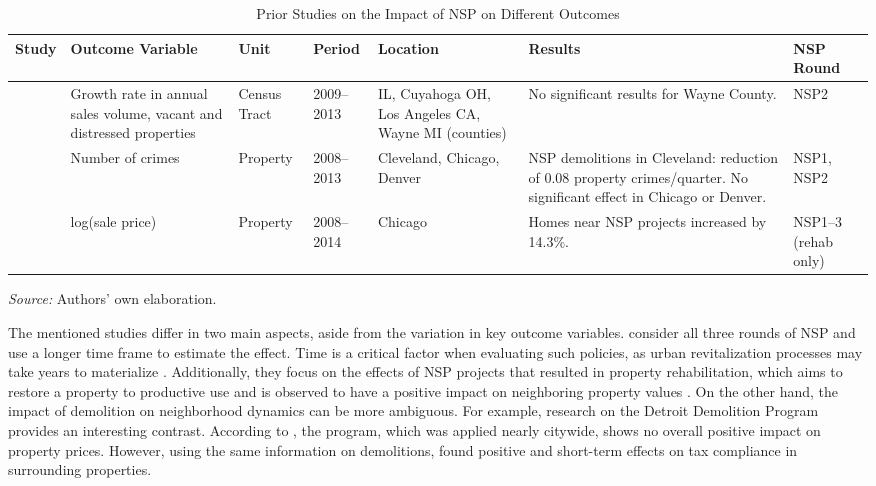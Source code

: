 \documentclass[12pt,authoryear]{elsarticle}
\begin{document}
\begin{table}[htbp]
\centering
\caption{Prior Studies on the Impact of NSP on Different Outcomes}
\label{tab:prior_studies}
\begin{threeparttable}
\small
\begin{tabularx}{\textwidth}{p{2.2cm}p{2.5cm}p{1.2cm}p{1.3cm}p{2.5cm}p{3cm}p{1cm}}
\toprule
Study & Outcome Variable & Unit & Period & Location & Results & NSP Round \\
\midrule
\citet{schuetz2016} & Growth rate in annual sales volume, vacant and distressed properties & Census Tract & 2009--2013 & IL, Cuyahoga OH, Los Angeles CA, Wayne MI (counties) & No significant results for Wayne County. & NSP2 \\
\addlinespace
\citet{spader2016} & Number of crimes & Property & 2008--2013 & Cleveland, Chicago, Denver & NSP demolitions in Cleveland: reduction of 0.08 property crimes/quarter. No significant effect in Chicago or Denver. & NSP1, NSP2 \\
\addlinespace
\citet{bak2017} & log(sale price) & Property & 2008--2014 & Chicago & Homes near NSP projects increased by 14.3\%. & NSP1--3 (rehab only) \\
\bottomrule
\end{tabularx}
\begin{tablenotes}[flushleft]
\footnotesize
\item \textit{Source:} Authors' own elaboration.
\end{tablenotes}
\end{threeparttable}
\end{table}

The mentioned studies differ in two main aspects, aside from the variation in key outcome variables. \citet{bak2017} consider all three rounds of NSP and use a longer time frame to estimate the effect. Time is a critical factor when evaluating such policies, as urban revitalization processes may take years to materialize \citep{galster2006,schuetz2015}. Additionally, they focus on the effects of NSP projects that resulted in property rehabilitation, which aims to restore a property to productive use \citep{collins2013} and is observed to have a positive impact on neighboring property values \citep{leonard2017,ganduri2021}. On the other hand, the impact of demolition on neighborhood dynamics can be more ambiguous. For example, research on the Detroit Demolition Program provides an interesting contrast. According to \citet{alvayay2023}, the program, which was applied nearly citywide, shows no overall positive impact on property prices. However, using the same information on demolitions, \citet{alvayay2020} found positive and short-term effects on tax compliance in surrounding properties.
\end{document}
